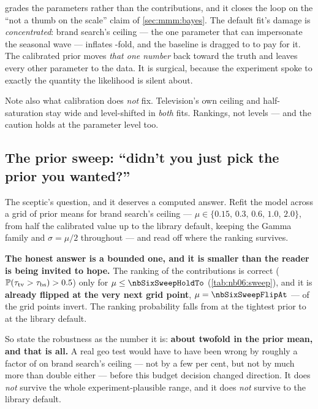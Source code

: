 

 grades the parameters rather than the contributions, and it closes the
loop on the ``not a thumb on the scale'' claim of \cref{sec:mmm:bayes}. The default fit's damage is
\emph{concentrated}: brand search's ceiling --- the one parameter that can impersonate the seasonal
wave --- inflates \nbSixDefCeilingBsOverTrue-fold, and the baseline is dragged to
\eur{\nbSixDefBaseline} to pay for it. The calibrated prior moves \emph{that one number} back
toward the truth and leaves every other parameter to the data. It is surgical, because the
experiment spoke to exactly the quantity the likelihood is silent about.

Note also what calibration does \emph{not} fix. Television's own ceiling and half-saturation stay
wide and level-shifted in \emph{both} fits. Rankings, not levels --- and the caution holds at the
parameter level too.

\subsection*{The prior sweep: ``didn't you just pick the prior you wanted?''}

The sceptic's question, and it deserves a computed answer. Refit the model across a grid of prior
means for brand search's ceiling --- $\mu \in \{0.15,\, 0.3,\, 0.6,\, 1.0,\, 2.0\}$, from half the
calibrated value up to the library default, keeping the Gamma family and $\sigma = \mu/2$
throughout --- and read off where the ranking survives.




\textbf{The honest answer is a bounded one, and it is smaller than the reader is being invited to
hope.} The ranking of the contributions is correct
($\operatorname{\mathbb{P}}(\tau_{\text{tv}} > \tau_{\text{bs}}) > 0.5$) only for $\mu \le \nbSixSweepHoldTo$
(\cref{tab:nb06:sweep}), and it is \textbf{already flipped at the very next grid point},
$\mu = \nbSixSweepFlipAt$ --- \nbSixSweepNFlipped{} of the \nbSixSweepNGrid{} grid points invert.
The ranking probability falls from \nbSixSweepPLo{} at the tightest prior to \nbSixSweepPHi{} at
the library default.

So state the robustness as the number it is: \textbf{about twofold in the prior mean, and that is
all.} A real geo test would have to have been wrong by roughly a factor of \nbSixSweepFactor{} on
brand search's ceiling --- not by a few per cent, but not by much more than double either ---
before this budget decision changed direction. It does \emph{not} survive the whole
experiment-plausible range, and it does \emph{not} survive to the library default.

